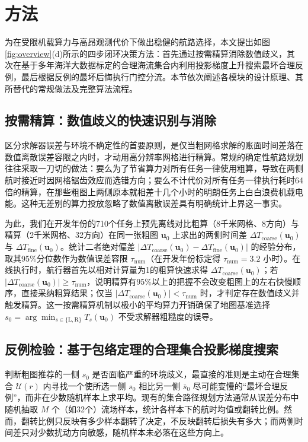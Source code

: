 \section{方法}

为在受限机载算力与高昂观测代价下做出稳健的航路选择，本文提出如图\ref{fig:overview}(d)所示的四步闭环决策方法：首先通过按需精算消除数值歧义，其次在基于多年海洋大数据标定的合理海流集合内利用投影梯度上升搜索最坏合理反例，最后根据反例的最坏后悔执行门控分流。本节依次阐述各模块的设计原理、其所替代的常规做法及完整算法流程。

\subsection{按需精算：数值歧义的快速识别与消除}
区分求解器误差与环境不确定性的首要原则，是仅当粗网格求解的账面时间差落在数值离散误差容限之内时，才动用高分辨率网格进行精算。常规的确定性航路规划往往采取一刀切的做法：要么为了节省算力对所有任务一律使用粗算，导致在两侧航时接近时因网格锯齿效应而选错方向；要么不计代价对所有任务一律执行耗时64倍的精算，在那些粗图上两侧原本就相差十几个小时的明朗任务上白白浪费机载电能。这种无差别的算力投放忽略了数值离散误差具有明确统计上界这一事实。

为此，我们在开发年份的710个任务上预先离线对比粗算（8千米网格、8方向）与精算（2千米网格、32方向）在同一张粗图 $\boldsymbol{u}_0$ 上求出的两侧时间差 $\Delta T_{\text{coarse}}(\boldsymbol{u}_0)$ 与 $\Delta T_{\text{fine}}(\boldsymbol{u}_0)$。统计二者绝对偏差 $|\Delta T_{\text{coarse}}(\boldsymbol{u}_0) - \Delta T_{\text{fine}}(\boldsymbol{u}_0)|$ 的经验分布，取其95\%分位数作为数值误差容限 $\tau_{\text{num}}$（在开发年份标定得 $\tau_{\text{num}} = 3.2$ 小时）。在线执行时，航行器首先以相对计算量为1的粗算快速求得 $\Delta T_{\text{coarse}}(\boldsymbol{u}_0)$；若 $|\Delta T_{\text{coarse}}(\boldsymbol{u}_0)| \ge \tau_{\text{num}}$，说明精算有95\%以上的把握不会改变粗图上的左右快慢顺序，直接采纳粗算结果；仅当 $|\Delta T_{\text{coarse}}(\boldsymbol{u}_0)| < \tau_{\text{num}}$ 时，才判定存在数值歧义并触发精算。这一按需精算机制以极小的平均算力开销确保了地图基准选择 $s_0 = \arg\min_{s \in \{\text{L}, \text{R}\}} T_s(\boldsymbol{u}_0)$ 不受求解器粗糙度的误导。

\subsection{反例检验：基于包络定理的合理集合投影梯度搜索}
判断粗图推荐的一侧 $s_0$ 是否面临严重的环境歧义，最直接的准则是主动在合理集合 $\mathcal{U}(r)$ 内寻找一个使所选一侧 $s_0$ 相比另一侧 $\bar{s}_0$ 尽可能变慢的“最坏合理反例”，而非在少数随机样本上求平均。现有的集合路径规划方法通常从误差分布中随机抽取 $M$ 个（如32个）流场样本，统计各样本下的航时均值或翻转比例\cite{wang2016path}。然而，翻转比例只反映有多少样本翻转了决定，不反映翻转后损失有多大；而两侧时间差只对少数扰动方向敏感，随机样本未必落在这些方向上。


